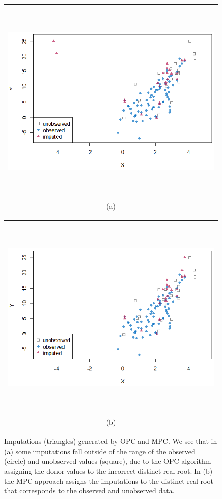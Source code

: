	\newpage
	\begin{figure}[ht!]
		\begin{tabular}{c}
			\includegraphics[width=\textwidth, height=10cm]{plots/plot2.1.eps} \\
			\textnormal{(a)}  \\[6pt]
		\end{tabular}
		\begin{tabular}{c}
			\includegraphics[width=\textwidth, height=10cm]{plots/plot2.2.eps}\\			
			\textnormal{(b)} \\[6pt]
		\end{tabular}
		\caption{Imputations (triangles) generated by OPC and MPC. We see that in (a) some imputations fall outside of the range of the observed (circle) and unobserved values (square), due to the OPC algorithm assigning the donor values to the incorrect distinct real root. In (b) the MPC approach assigns the imputations to the distinct real root that corresponds to the observed and unobserved data.}
		\label{fig2_1}
	\end{figure}
	
